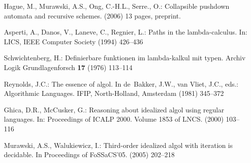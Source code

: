\documentclass{llncs}
\begin{document}
\begin{thebibliography}{10}
Hague, M., Murawski, A.S., Ong, C.-H.L., Serre., O.:
\newblock Collapsible pushdown automata and recursive schemes.
\newblock (2006) 13 pages, preprint.

Asperti, A., Danos, V., Laneve, C., Regnier, L.:
\newblock Paths in the lambda-calculus.
\newblock In: LICS, IEEE Computer Society (1994)  426--436






Schwichtenberg, H.:
\newblock Definierbare funktionen im lambda-kalkul mit typen.
\newblock Archiv Logik Grundlagenforsch \textbf{17} (1976)  113--114

Reynolds, J.C.:
\newblock The essence of algol.
\newblock In de~Bakker, J.W., van Vliet, J.C., eds.: Algorithmic Languages.
\newblock IFIP, North-Holland, Amsterdam (1981)  345--372

Ghica, D.R., McCusker, G.:
\newblock Reasoning about idealized {\sc algol} using regular languages.
\newblock In: Proceedings of ICALP 2000. Volume 1853 of LNCS.
  (2000)  103--116

Murawski, A.S., Walukiewicz, I.:
\newblock Third-order idealized algol with iteration is decidable.
\newblock In Proceedings of FoSSaCS'05. (2005)  202--218


\end{thebibliography}
\end{document}
